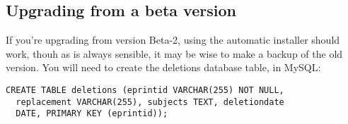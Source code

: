 \documentclass[a4paper]{article}
\begin{document}
\subsection{Upgrading from a beta version}

If you're upgrading from version Beta-2, using the automatic installer should work, thouh as is always sensible, it may be wise to make a backup of the old version. You will need to create the deletions database table, in MySQL:

\begin{verbatim}
CREATE TABLE deletions (eprintid VARCHAR(255) NOT NULL,
  replacement VARCHAR(255), subjects TEXT, deletiondate
  DATE, PRIMARY KEY (eprintid));
\end{verbatim}


\end{document}

